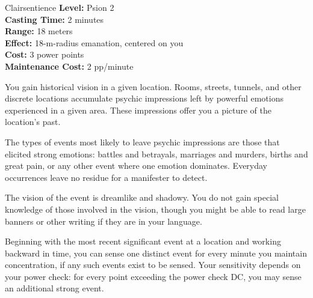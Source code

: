 {Clairsentience}
{
	\textbf{Level:}
	Psion 2\\
	\textbf{Casting Time:}
	2 minutes\\
	\textbf{Range:}
	18 meters\\
	\textbf{Effect:}
	18-m-radius emanation, centered on you\\
	\textbf{Cost:}
	3 power points\\
	\textbf{Maintenance Cost:}
	2 pp/minute\\
}
{
	You gain historical vision in a given location. Rooms, streets, tunnels, and other discrete locations accumulate psychic impressions left by powerful emotions experienced in a given area. These impressions offer you a picture of the location's past.

	The types of events most likely to leave psychic impressions are those that elicited strong emotions: battles and betrayals, marriages and murders, births and great pain, or any other event where one emotion dominates. Everyday occurrences leave no residue for a manifester to detect.

	The vision of the event is dreamlike and shadowy. You do not gain special knowledge of those involved in the vision, though you might be able to read large banners or other writing if they are in your language.

	Beginning with the most recent significant event at a location and working backward in time, you can sense one distinct event for every minute you maintain concentration, if any such events exist to be sensed. Your sensitivity depends on your power check: for every point exceeding the power check DC, you may sense an additional strong event.
}